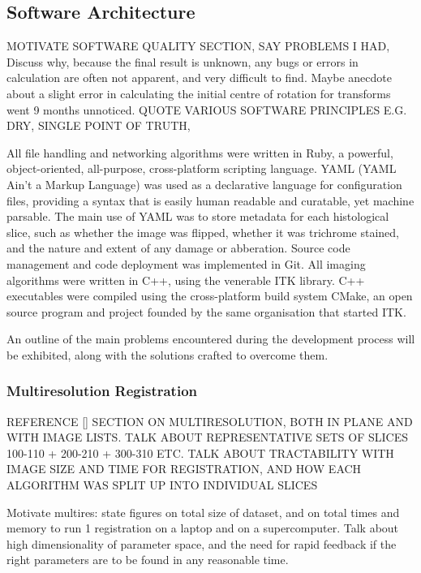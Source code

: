   \subsection{Software Architecture} %
  \label{sub:software_architecture}
    MOTIVATE SOFTWARE QUALITY SECTION, SAY PROBLEMS I HAD, Discuss why, because the final result is unknown, any bugs or errors in calculation are often not apparent, and very difficult to find. Maybe anecdote about a slight error in calculating the initial centre of rotation for transforms went 9 months unnoticed. QUOTE VARIOUS SOFTWARE PRINCIPLES E.G. DRY, SINGLE POINT OF TRUTH,

    All file handling and networking algorithms were written in Ruby, a powerful, object-oriented, all-purpose, cross-platform scripting language. YAML (YAML Ain't a Markup Language) was used as a declarative language for configuration files, providing a syntax that is easily human readable and curatable, yet machine parsable. The main use of YAML was to store metadata for each histological slice, such as whether the image was flipped, whether it was trichrome stained, and the nature and extent of any damage or abberation. Source code management and code deployment was implemented in Git. All imaging algorithms were written in C++, using the venerable ITK library. C++ executables were compiled using the cross-platform build system CMake, an open source program and project founded by the same organisation that started ITK.
    
    An outline of the main problems encountered during the development process will be exhibited, along with the solutions crafted to overcome them.
    
    \subsubsection{Multiresolution Registration} %
    \label{ssub:multiresolution_registration}
      REFERENCE \ref{}
      SECTION ON MULTIRESOLUTION, BOTH IN PLANE AND WITH IMAGE LISTS. TALK ABOUT REPRESENTATIVE SETS OF SLICES 100-110 + 200-210 + 300-310 ETC. TALK ABOUT TRACTABILITY WITH IMAGE SIZE AND TIME FOR REGISTRATION, AND HOW EACH ALGORITHM WAS SPLIT UP INTO INDIVIDUAL SLICES
      
      Motivate multires: state figures on total size of dataset, and on total times and memory to run 1 registration on a laptop and on a supercomputer. Talk about high dimensionality of parameter space, and the need for rapid feedback if the right parameters are to be found in any reasonable time.
    
